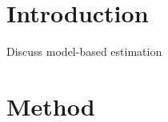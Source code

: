 \documentclass[conference]{IEEEtran}
\begin{document}
\maketitle

\begin{abstract}

\end{abstract}





%
\IEEEpeerreviewmaketitle


\section{Introduction}
Discuss model-based estimation


\section{Method}
\end{document}
